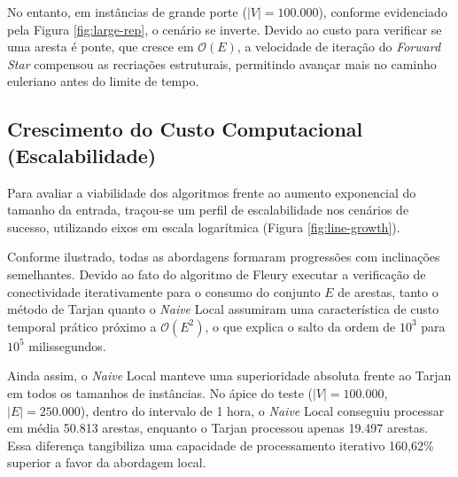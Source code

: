 \documentclass[12pt]{article}
\begin{document}
No entanto, em instâncias de grande porte ($|V| = 100.000$), conforme evidenciado pela Figura \ref{fig:large-rep}, o cenário se inverte. Devido ao custo para verificar se uma aresta é ponte, que cresce em $\mathcal{O}(E)$, a velocidade de iteração do \textit{Forward Star} compensou as recriações estruturais, permitindo avançar mais no caminho euleriano antes do limite de tempo.

\subsection{Crescimento do Custo Computacional (Escalabilidade)}

Para avaliar a viabilidade dos algoritmos frente ao aumento exponencial do tamanho da entrada, traçou-se um perfil de escalabilidade nos cenários de sucesso, utilizando eixos em escala logarítmica (Figura \ref{fig:line-growth}).

Conforme ilustrado, todas as abordagens formaram progressões com inclinações semelhantes. Devido ao fato do algoritmo de Fleury executar a verificação de conectividade iterativamente para o consumo do conjunto $E$ de arestas, tanto o método de Tarjan quanto o \textit{Naive} Local assumiram uma característica de custo temporal prático próximo a $\mathcal{O}(E^2)$, o que explica o salto da ordem de $10^3$ para $10^5$ milissegundos.

Ainda assim, o \textit{Naive} Local manteve uma superioridade absoluta frente ao Tarjan em todos os tamanhos de instâncias. No ápice do teste ($|V|=100.000$, $|E|=250.000$), dentro do intervalo de 1 hora, o \textit{Naive} Local conseguiu processar em média 50.813 arestas, enquanto o Tarjan processou apenas 19.497 arestas. Essa diferença tangibiliza uma capacidade de processamento iterativo 160,62\% superior a favor da abordagem local.

\newpage
\end{document}
